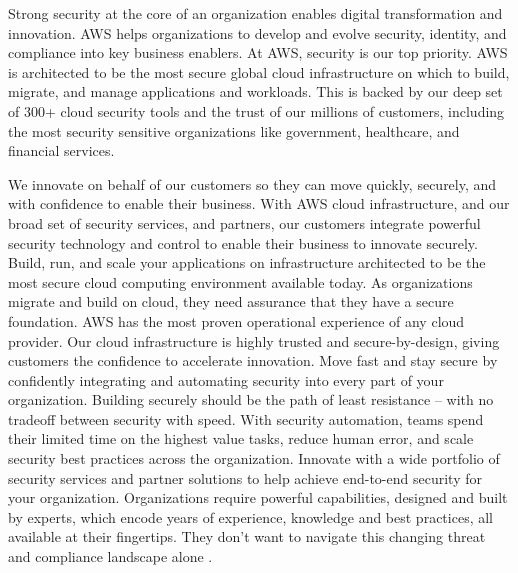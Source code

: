 Strong security at the core of an organization enables digital transformation and innovation. AWS helps organizations to develop and evolve security, identity, and compliance into key business enablers. At AWS, security is our top priority. AWS is architected to be the most secure global cloud infrastructure on which to build, migrate, and manage applications and workloads. This is backed by our deep set of 300+ cloud security tools and the trust of our millions of customers, including the most security sensitive organizations like government, healthcare, and financial services.

We innovate on behalf of our customers so they can move quickly, securely, and with confidence to enable their business. With AWS cloud infrastructure, and our broad set of security services, and partners, our customers integrate powerful security technology and control to enable their business to innovate securely. Build, run, and scale your applications on infrastructure architected to be the most secure cloud computing environment available today. As organizations migrate and build on cloud, they need assurance that they have a secure foundation. AWS has the most proven operational experience of any cloud provider. Our cloud infrastructure is highly trusted and secure-by-design, giving customers the confidence to accelerate innovation. Move fast and stay secure by confidently integrating and automating security into every part of your organization. Building securely should be the path of least resistance – with no tradeoff between security with speed. With security automation, teams spend their limited time on the highest value tasks, reduce human error, and scale security best practices across the organization. Innovate with a wide portfolio of security services and partner solutions to help achieve end-to-end security for your organization. Organizations require powerful capabilities, designed and built by experts, which encode years of experience, knowledge and best practices, all available at their fingertips. They don't want to navigate this changing threat and compliance landscape alone \cite{AWSSecurity}.

